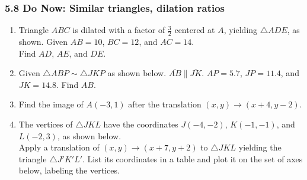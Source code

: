 \documentclass[12pt, twoside]{article}
\begin{document}
\subsubsection*{5.8 Do Now: Similar triangles, dilation ratios}
 \begin{enumerate}

  \item Triangle $ABC$ is dilated with a factor of $\frac{3}{2}$ centered at $A$, yielding $\triangle ADE$, as shown. Given $AB=10$, $BC=12$, and $AC=14$. \\[0.25cm] Find $AD$, $AE$, and $DE$.
    \begin{flushright}
      \end{flushright}

   \vspace{2cm}

   \item Given $\triangle ABP \sim \triangle JKP$ as shown below. $\overline{AB} \parallel \overline{JK}$. $AP=5.7$, $JP=11.4$, and $JK=14.8$. Find $AB$.
    \begin{flushright}
       \end{flushright}
       \vspace{2cm}

    \item Find the image of $A(-3,1)$ after the translation $(x,y) \rightarrow (x+4,y-2)$.
  
\newpage
    \item The vertices of $\triangle JKL$ have the coordinates $J(-4,-2)$, $K(-1,-1)$, and $L(-2,3)$, as shown below. \\[0.5cm]
    Apply a translation of $(x,y) \rightarrow (x+7, y+2)$ to $\triangle JKL$  yielding the triangle $\triangle J'K'L'$. List its coordinates in a table and plot it on the set of axes below, labeling the vertices.
    \begin{flushright}
\end{flushright}
\end{enumerate}
\end{document}
